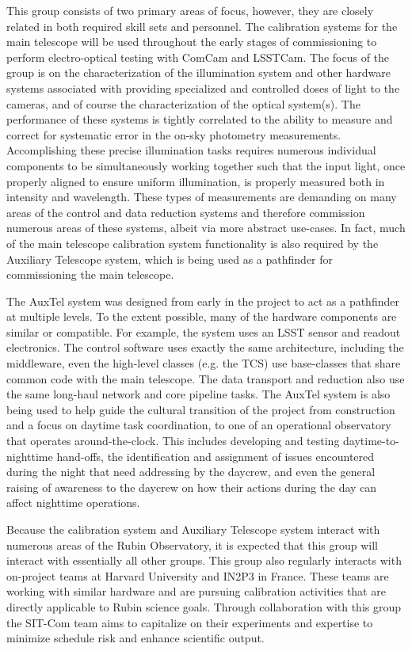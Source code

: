 \documentclass[SE,lsstdraft,authoryear,toc]{lsstdoc}
\begin{document}
This group consists of two primary areas of focus, however, they are closely related in both required skill sets and personnel.
The calibration systems for the main telescope will be used throughout the early stages of commissioning to perform electro-optical testing with ComCam and LSSTCam.
The focus of the group is on the characterization of the illumination system and other hardware systems associated with providing specialized and controlled doses of light to the cameras, and of course the characterization of the optical system(s).
The performance of these systems is tightly correlated to the ability to measure and correct for systematic error in the on-sky photometry measurements.
Accomplishing these precise illumination tasks requires numerous individual components to be simultaneously working together such that the input light, once properly aligned to ensure uniform illumination, is properly measured both in intensity and wavelength.
These types of measurements are demanding on many areas of the control and data reduction systems and therefore commission numerous areas of these systems, albeit via more abstract use-cases.
In fact, much of the main telescope calibration system functionality is also required by the Auxiliary Telescope system, which is being used as a pathfinder for commissioning the main telescope.

The AuxTel system was designed from early in the project to act as a pathfinder at multiple levels.
To the extent possible, many of the hardware components are similar or compatible.
For example, the system uses an LSST sensor and readout electronics.
The control software uses exactly the same architecture, including the middleware, even the high-level classes (e.g. the TCS) use base-classes that share common code with the main telescope.
The data transport and reduction also use the same long-haul network and core pipeline tasks.
The AuxTel system is also being used to help guide the cultural transition of the project from construction and a focus on daytime task coordination, to one of an operational observatory that operates around-the-clock.
This includes developing and testing daytime-to-nighttime hand-offs, the identification and assignment of issues encountered during the night that need addressing by the daycrew, and even the general raising of awareness to the daycrew on how their actions during the day can affect nighttime operations.

Because the calibration system and Auxiliary Telescope system interact with numerous areas of the Rubin Observatory, it is expected that this group will interact with essentially all other groups.
This group also regularly interacts with on-project teams at Harvard University and IN2P3 in France.
These teams are working with similar hardware and are pursuing calibration activities that are directly applicable to Rubin science goals.
Through collaboration with this group the SIT-Com team aims to capitalize on their experiments and expertise to minimize schedule risk and enhance scientific output.
\end{document}

